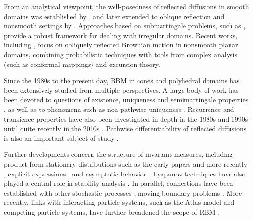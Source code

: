 \documentclass[11pt]{article}
\theoremstyle{definition}
\begin{document}
From an analytical viewpoint, the well-posedness of reflected diffusions in smooth domains was established by \cite{LionsSznitman1984}, and later extended to oblique reflection and nonsmooth settings by \cite{DupuisIshii1993}. 
Approaches based on submartingale problems, such as \cite{Ramanan2006}, provide a robust framework for dealing with irregular domains. Recent works, including \cite{Burdzy2017}, focus on obliquely reflected Brownian motion in nonsmooth planar domains, combining probabilistic techniques with tools from complex analysis (such as conformal mappings) and excursion theory. %

Since the 1980s to the present day, RBM in cones and polyhedral domains has been extensively studied from multiple perspectives. A large body of work has been devoted to questions of existence, uniqueness and semimartingale properties 
\cite{varadhan_brownian_1985,
Williams-85, williams_semimartingale_1995, Burdzy2017}, as well as to phenomena such as non-pathwise uniqueness \cite{bass2024}. Recurrence and transience properties have also been investigated in depth in the 1980s \cite{williams_recurrence_1985} and 1990s
\cite{hobson_recurrence_1993, taylor_existence_1993, dupuis_lyapunov_1994, Ch-96} until quite recently in the 2010s
\cite{Br-11, BrDaHa-10, Kang2014}. Pathwise differentiability of reflected diffusions is also an important subject of study \cite{Lipshutz19}. 

Further developments concern the structure of invariant measures, including product-form stationary distributions such as the early papers
\cite{harrison_multidimensional_1987, williams_reflected_1987} and more recently
\cite{dieker_reflected_2009, OCOr-14}, explicit expressions \cite{franceschi_raschel_integral_2019,franceschi_bousquet_melou_price_hardouin_raschel_stationary_2023}, and asymptotic behavior
\cite{harrison_reflected_2009, dai_reflecting_2011, franceschi_kourkova_asymptotic_2017}. 
Lyapunov techniques have also played a central role in stability analysis 
\cite{dupuis_lyapunov_1994, sarantsev_reflected_2017}. In parallel, connections have been established with other stochastic processes 
\cite{biane_94, dubedat_reflected_2004, lega-87, Lep}, moving boundary problems \cite{Burdzy2009}. 
More recently, links with interacting particle systems, such as the Atlas model and competing particle systems, have further broadened the scope of RBM 
\cite{BanerjeeBudhiraja,ichiba_karatzas_degenerate_22}. 
\end{document}

